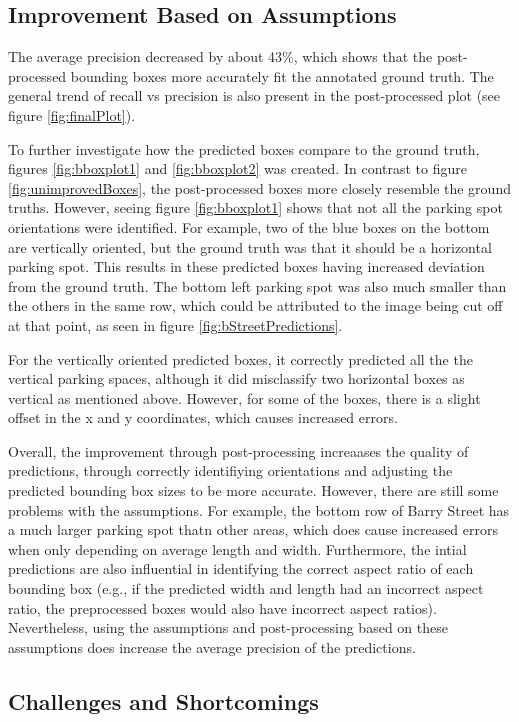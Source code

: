 \documentclass[man]{apa7}
\begin{document}
\subsection{Improvement Based on Assumptions}
The average precision decreased by about 43\%, which shows that the post-processed bounding boxes more accurately fit the annotated ground truth. The general trend of recall vs precision is also present in the post-processed plot (see figure \ref{fig:finalPlot}). 

To further investigate how the predicted boxes compare to the ground truth, figures \ref{fig:bboxplot1} and \ref{fig:bboxplot2} was created. In contrast to figure \ref{fig:unimprovedBoxes}, the post-processed boxes more closely resemble the ground truths. However, seeing figure \ref{fig:bboxplot1} shows that not all the parking spot orientations were identified. For example, two of the blue boxes on the bottom are vertically oriented, but the ground truth was that it should be a horizontal parking spot. This results in these predicted boxes having increased deviation from the ground truth. The bottom left parking spot was also much smaller than the others in the same row, which could be attributed to the image being cut off at that point, as seen in figure \ref{fig:bStreetPredictions}. 

For the vertically oriented predicted boxes, it correctly predicted all the the vertical parking spaces, although it did misclassify two horizontal boxes as vertical as mentioned above. However, for some of the boxes, there is a slight offset in the x and y coordinates, which causes increased errors.

Overall, the improvement through post-processing increaases the quality of predictions, through correctly identifiying orientations and adjusting the predicted bounding box sizes to be more accurate. However, there are still some problems with the assumptions. For example, the bottom row of Barry Street has a much larger parking spot thatn other areas, which does cause increased errors when only depending on average length and width. Furthermore, the intial predictions are also influential in identifying the correct aspect ratio of each bounding box (e.g., if the predicted width and length had an incorrect aspect ratio, the preprocessed boxes would also have incorrect aspect ratios). Nevertheless, using the assumptions and post-processing based on these assumptions does increase the average precision of the predictions.

\subsection{Challenges and Shortcomings}
\end{document}
